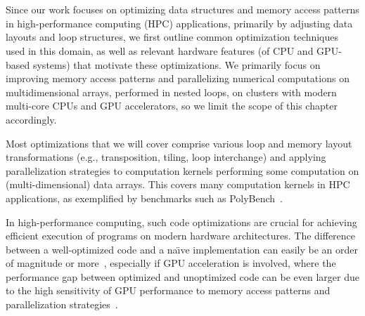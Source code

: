 \chapter{}\label{chap:code-optimization}


Since our work focuses on optimizing data structures and memory access patterns in high-performance computing (HPC) applications, primarily by adjusting data layouts and loop structures, we first outline common optimization techniques used in this domain, as well as relevant hardware features (of CPU and GPU-based systems) that motivate these optimizations. We primarily focus on improving memory access patterns and parallelizing numerical computations on multidimensional arrays, performed in nested loops, on clusters with modern multi-core CPUs and GPU accelerators, so we limit the scope of this chapter accordingly.


Most optimizations that we will cover comprise various loop and memory layout transformations (e.g., transposition, tiling, loop interchange) and applying parallelization strategies to computation kernels performing some computation on (multi-dimensional) data arrays. This covers many computation kernels in HPC applications, as exemplified by benchmarks such as PolyBench~\cite{bacon1994compiler,pouchet2012polybench}.

In high-performance computing, such code optimizations are crucial for achieving efficient execution of programs on modern hardware architectures. The difference between a well-optimized code and a na\"{\i}ve implementation can easily be an order of magnitude or more~\cite{hennessy2019computer}, especially if GPU acceleration is involved, where the performance gap between optimized and unoptimized code can be even larger due to the high sensitivity of GPU performance to memory access patterns and parallelization strategies~\cite{cuda_programming_guide}.


